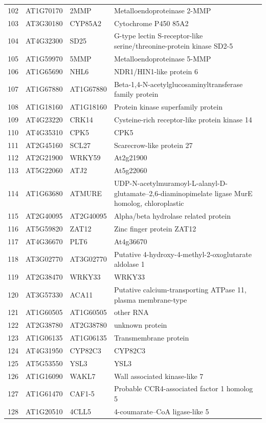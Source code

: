 \documentclass[11pt]{article}
\begin{document}
\begin{center}
\begin{tabular}{rlll}
102 & AT1G70170 & 2MMP & Metalloendoproteinase 2-MMP\\
103 & AT3G30180 & CYP85A2 & Cytochrome P450 85A2\\
104 & AT4G32300 & SD25 & G-type lectin S-receptor-like serine/threonine-protein kinase SD2-5\\
105 & AT1G59970 & 5MMP & Metalloendoproteinase 5-MMP\\
106 & AT1G65690 & NHL6 & NDR1/HIN1-like protein 6\\
107 & AT1G67880 & AT1G67880 & Beta-1,4-N-acetylglucosaminyltransferase family protein\\
108 & AT1G18160 & AT1G18160 & Protein kinase superfamily protein\\
109 & AT4G23220 & CRK14 & Cysteine-rich receptor-like protein kinase 14\\
110 & AT4G35310 & CPK5 & CPK5\\
111 & AT2G45160 & SCL27 & Scarecrow-like protein 27\\
112 & AT2G21900 & WRKY59 & At2g21900\\
113 & AT5G22060 & ATJ2 & At5g22060\\
114 & AT1G63680 & ATMURE & UDP-N-acetylmuramoyl-L-alanyl-D-glutamate--2,6-diaminopimelate ligase MurE homolog, chloroplastic\\
115 & AT2G40095 & AT2G40095 & Alpha/beta hydrolase related protein\\
116 & AT5G59820 & ZAT12 & Zinc finger protein ZAT12\\
117 & AT4G36670 & PLT6 & At4g36670\\
118 & AT3G02770 & AT3G02770 & Putative 4-hydroxy-4-methyl-2-oxoglutarate aldolase 1\\
119 & AT2G38470 & WRKY33 & WRKY33\\
120 & AT3G57330 & ACA11 & Putative calcium-transporting ATPase 11, plasma membrane-type\\
121 & AT1G60505 & AT1G60505 & other RNA\\
122 & AT2G38780 & AT2G38780 & unknown protein\\
123 & AT1G06135 & AT1G06135 & Transmembrane protein\\
124 & AT4G31950 & CYP82C3 & CYP82C3\\
125 & AT5G53550 & YSL3 & YSL3\\
126 & AT1G16090 & WAKL7 & Wall associated kinase-like 7\\
127 & AT1G61470 & CAF1-5 & Probable CCR4-associated factor 1 homolog 5\\
128 & AT1G20510 & 4CLL5 & 4-coumarate--CoA ligase-like 5\\

\end{tabular}
\end{center}
\end{document}
